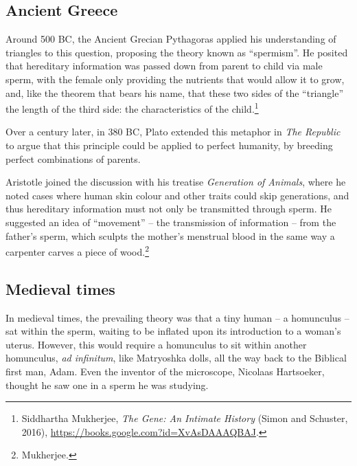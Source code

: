 \documentclass[
]{book}
\begin{document}
\hypertarget{ancient-greece}{%
\subsection{Ancient Greece}\label{ancient-greece}}

Around 500 BC, the Ancient Grecian Pythagoras applied his understanding of triangles to this question, proposing the theory known as ``spermism''. He posited that hereditary information was passed down from parent to child via male sperm, with the female only providing the nutrients that would allow it to grow, and, like the theorem that bears his name, that these two sides of the ``triangle'' the length of the third side: the characteristics of the child.\footnote{Siddhartha Mukherjee, \emph{The {Gene}: {An Intimate History}} ({Simon and Schuster}, 2016), \url{https://books.google.com?id=XvAsDAAAQBAJ}.}

Over a century later, in 380 BC, Plato extended this metaphor in \emph{The Republic} to argue that this principle could be applied to perfect humanity, by breeding perfect combinations of parents.

Aristotle joined the discussion with his treatise \emph{Generation of Animals}, where he noted cases where human skin colour and other traits could skip generations, and thus hereditary information must not only be transmitted through sperm. He suggested an idea of ``movement'' -- the transmission of information -- from the father's sperm, which sculpts the mother's menstrual blood in the same way a carpenter carves a piece of wood.\footnote{Mukherjee.}

\hypertarget{medieval-times}{%
\subsection{Medieval times}\label{medieval-times}}

In medieval times, the prevailing theory was that a tiny human -- a homunculus -- sat within the sperm, waiting to be inflated upon its introduction to a woman's uterus. However, this would require a homunculus to sit within another homunculus, \emph{ad infinitum}, like Matryoshka dolls, all the way back to the Biblical first man, Adam. Even the inventor of the microscope, Nicolaas Hartsoeker, thought he saw one in a sperm he was studying.
\end{document}

